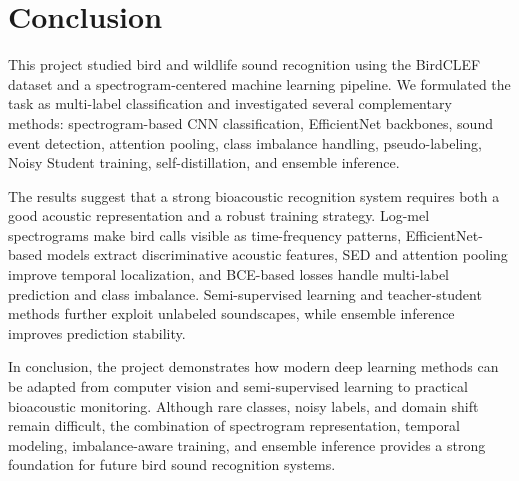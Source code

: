 \documentclass[a4paper,12pt]{article}
\begin{document}
\section{Conclusion}
This project studied bird and wildlife sound recognition using the BirdCLEF dataset and a spectrogram-centered machine learning pipeline. We formulated the task as multi-label classification and investigated several complementary methods: spectrogram-based CNN classification, EfficientNet backbones, sound event detection, attention pooling, class imbalance handling, pseudo-labeling, Noisy Student training, self-distillation, and ensemble inference.

The results suggest that a strong bioacoustic recognition system requires both a good acoustic representation and a robust training strategy. Log-mel spectrograms make bird calls visible as time-frequency patterns, EfficientNet-based models extract discriminative acoustic features, SED and attention pooling improve temporal localization, and BCE-based losses handle multi-label prediction and class imbalance. Semi-supervised learning and teacher-student methods further exploit unlabeled soundscapes, while ensemble inference improves prediction stability.

In conclusion, the project demonstrates how modern deep learning methods can be adapted from computer vision and semi-supervised learning to practical bioacoustic monitoring. Although rare classes, noisy labels, and domain shift remain difficult, the combination of spectrogram representation, temporal modeling, imbalance-aware training, and ensemble inference provides a strong foundation for future bird sound recognition systems.
\end{document}
